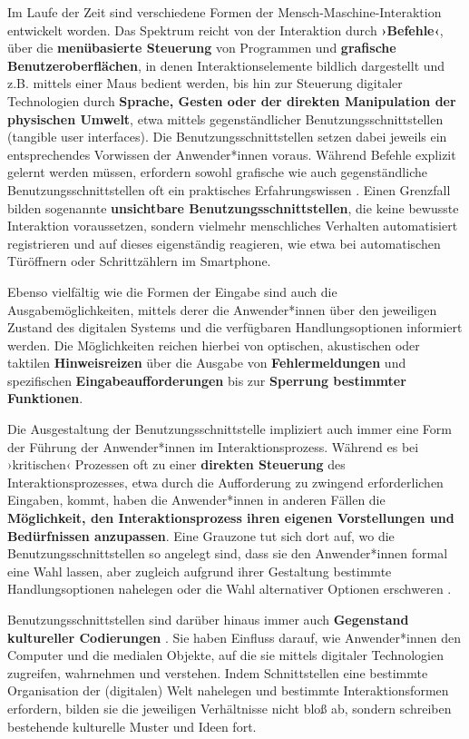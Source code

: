 \documentclass[
  a4paper,
]{book}
\begin{document}
Im Laufe der Zeit sind verschiedene Formen der Mensch-Maschine-Interaktion entwickelt worden. Das Spektrum reicht von der Interaktion durch \textbf{›Befehle‹}, über die \textbf{menübasierte Steuerung} von Programmen und \textbf{grafische Benutzeroberflächen}, in denen Interaktionselemente bildlich dargestellt und z.B. mittels einer Maus bedient werden, bis hin zur Steuerung digitaler Technologien durch \textbf{Sprache, Gesten oder der direkten Manipulation der physischen Umwelt}, etwa mittels gegenständlicher Benutzungsschnittstellen (tangible user interfaces). Die Benutzungsschnittstellen setzen dabei jeweils ein entsprechendes Vorwissen der Anwender*innen voraus. Während Befehle explizit gelernt werden müssen, erfordern sowohl grafische wie auch gegenständliche Benutzungsschnittstellen oft ein praktisches Erfahrungswissen \citep[vgl. z.B.][]{schelhoweTechnologieImaginationUnd2007}. Einen Grenzfall bilden sogenannte \textbf{unsichtbare Benutzungsschnittstellen}, die keine bewusste Interaktion voraussetzen, sondern vielmehr menschliches Verhalten automatisiert registrieren und auf dieses eigenständig reagieren, wie etwa bei automatischen Türöffnern oder Schrittzählern im Smartphone.

Ebenso vielfältig wie die Formen der Eingabe sind auch die Ausgabemöglichkeiten, mittels derer die Anwender*innen über den jeweiligen Zustand des digitalen Systems und die verfügbaren Handlungsoptionen informiert werden. Die Möglichkeiten reichen hierbei von optischen, akustischen oder taktilen \textbf{Hinweisreizen} über die Ausgabe von \textbf{Fehlermeldungen} und spezifischen \textbf{Eingabeaufforderungen} bis zur \textbf{Sperrung bestimmter Funktionen}.

Die Ausgestaltung der Benutzungsschnittstelle impliziert auch immer eine Form der Führung der Anwender*innen im Interaktionsprozess. Während es bei ›kritischen‹ Prozessen oft zu einer \textbf{direkten Steuerung} des Interaktionsprozesses, etwa durch die Aufforderung zu zwingend erforderlichen Eingaben, kommt, haben die Anwender*innen in anderen Fällen die \textbf{Möglichkeit, den Interaktionsprozess ihren eigenen Vorstellungen und Bedürfnissen anzupassen}. Eine Grauzone tut sich dort auf, wo die Benutzungsschnittstellen so angelegt sind, dass sie den Anwender*innen formal eine Wahl lassen, aber zugleich aufgrund ihrer Gestaltung bestimmte Handlungsoptionen nahelegen oder die Wahl alternativer Optionen erschweren \citep[vgl. z.B.][]{dieterDarkPatternsInterface2015}.

Benutzungsschnittstellen sind darüber hinaus immer auch \textbf{Gegenstand kultureller Codierungen} \citep{manovichLanguageNewMedia2001}. Sie haben Einfluss darauf, wie Anwender*innen den Computer und die medialen Objekte, auf die sie mittels digitaler Technologien zugreifen, wahrnehmen und verstehen. Indem Schnittstellen eine bestimmte Organisation der (digitalen) Welt nahelegen und bestimmte Interaktionsformen erfordern, bilden sie die jeweiligen Verhältnisse nicht bloß ab, sondern schreiben bestehende kulturelle Muster und Ideen fort.
\end{document}
